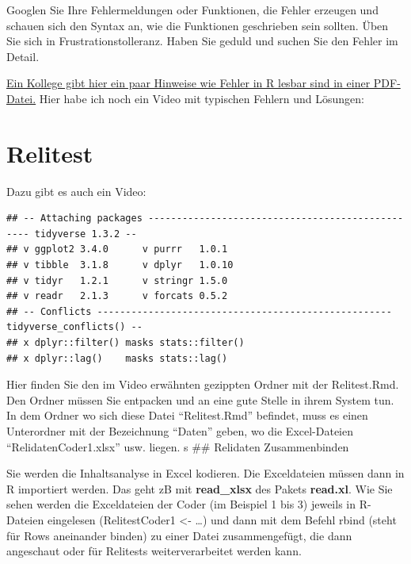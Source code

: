 \documentclass[twoside, pagesize, fontsize=11pt, dvipsnames]{scrreport}
\begin{document}
Googlen Sie Ihre Fehlermeldungen oder Funktionen, die Fehler erzeugen
und schauen sich den Syntax an, wie die Funktionen geschrieben sein
sollten. Üben Sie sich in Frustrationstolleranz. Haben Sie geduld und
suchen Sie den Fehler im Detail.

\href{https://www.uni-muenster.de/imperia/md/content/psyifp/ae_holling/r-fehlermeldungen.pdf}{Ein
Kollege gibt hier ein paar Hinweise wie Fehler in R lesbar sind in einer
PDF-Datei.} Hier habe ich noch ein Video mit typischen Fehlern und
Lösungen:


\hypertarget{relitest}{%
\chapter{Relitest}\label{relitest}}

Dazu gibt es auch ein Video:

\begin{verbatim}
## -- Attaching packages ------------------------------------------------- tidyverse 1.3.2 --
## v ggplot2 3.4.0      v purrr   1.0.1 
## v tibble  3.1.8      v dplyr   1.0.10
## v tidyr   1.2.1      v stringr 1.5.0 
## v readr   2.1.3      v forcats 0.5.2 
## -- Conflicts ---------------------------------------------------- tidyverse_conflicts() --
## x dplyr::filter() masks stats::filter()
## x dplyr::lag()    masks stats::lag()
\end{verbatim}

Hier finden Sie den im Video erwähnten gezippten Ordner mit der
Relitest.Rmd. Den Ordner müssen Sie entpacken und an eine gute Stelle in
ihrem System tun. In dem Ordner wo sich diese Datei
\enquote{Relitest.Rmd} befindet, muss es einen Unterordner mit der
Bezeichnung \enquote{Daten} geben, wo die Excel-Dateien
\enquote{RelidatenCoder1.xlsx} usw. liegen. s \#\# Relidaten
Zusammenbinden

Sie werden die Inhaltsanalyse in Excel kodieren. Die Exceldateien müssen
dann in R importiert werden. Das geht zB mit \textbf{read\_xlsx} des
Pakets \textbf{read.xl}. Wie Sie sehen werden die Exceldateien der Coder
(im Beispiel 1 bis 3) jeweils in R-Dateien eingelesen (RelitestCoder1
\textless- \ldots) und dann mit dem Befehl rbind (steht für Rows
aneinander binden) zu einer Datei zusammengefügt, die dann angeschaut
oder für Relitests weiterverarbeitet werden kann.
\end{document}
